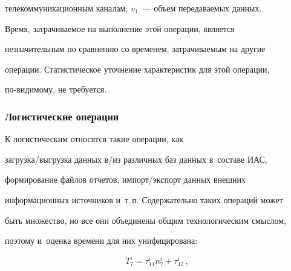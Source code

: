 телекоммуникационным каналам; $v_1$~--- объем передаваемых данных. 


Время, затрачиваемое на выполнение этой операции, является 


незначительным по сравнению со временем, затрачиваемым на другие 


операции. Статистическое уточнение характеристик для этой операции,  


по-ви\-ди\-мо\-му, не требуется.





\vspace*{-3pt}


      


      \subsubsection{Логистические операции}


      


      К логистическим относятся такие операции, как  


за\-груз\-ка\!/\!вы\-груз\-ка данных в\!/\!из различных баз данных в~составе ИАС, 


формирование файлов отчетов, им\-порт\!/\!экс\-порт данных внешних 


информационных источников и~т.\,п. Содержательно таких операций может 


быть множество, но все они объединены общим технологическим смыслом, 


поэтому и~оценка времени для них унифицирована:





\vspace*{2pt}





\noindent


      \begin{equation}


      T_7^i= \tau^i_{11} n_7^i+\tau^i_{12}\,,


      \label{e11-bor}


      \end{equation}


      


      \vspace*{-2pt}


